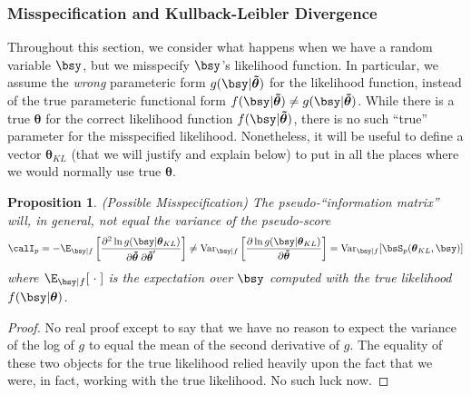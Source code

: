 \documentclass[12pt]{article}
\theoremstyle{plain}
\newtheorem{prop}[thm]{Proposition}
\theoremstyle{definition}
\theoremstyle{remark}
\newcommand{\bstheta}{\boldsymbol{\theta}}
\newcommand{\bstildetheta}{\boldsymbol{\tilde{\theta}}}
\newcommand{\Var}{\operatorname{Var}}
\begin{document}
\subsubsection{Misspecification and Kullback-Leibler Divergence}

Throughout this section, we consider what happens when we have a random
variable $\bsy$, but we misspecify $\bsy$'s likelihood function.
In particular, we assume the \emph{wrong} parameteric form
$g(\bsy|\bstildetheta)$ for the likelihood function, instead of the true
parameteric functional form $f(\bsy|\bstildetheta)\neq
g(\bsy|\bstildetheta)$. While there is a true $\bstheta$ for the correct
likelihood function $f(\bsy|\bstildetheta)$, there is no such ``true''
parameter for the misspecified likelihood. Nonetheless, it will be
useful to define a vector $\bstheta_{KL}$ (that we will justify and
explain below) to put in all the places where we would normally use true
$\bstheta$.

\begin{prop}\emph{(Possible Misspecification)}
The pseudo-``information matrix'' will, in general, not equal the
variance of the pseudo-score
\begin{align*}
  \calI_p
  =
  -\E_{\bsy|f}\left[
    \frac{\partial^2 \ln g(\bsy|\bstheta_{KL})}{%
      \partial\bstildetheta\;\partial\bstildetheta'}
  \right]
  \neq
  \Var_{\bsy|f}\left[
    \frac{\partial \ln g(\bsy|\bstheta_{KL})}{%
      \partial\bstildetheta}
  \right]
  =
  \Var_{\bsy|f}[\bsS_p(\bstheta_{KL},\bsy)]
\end{align*}
where $\E_{\bsy|f}[\;\cdot\;]$ is the expectation over $\bsy$ computed
with the true likelihood $f(\bsy|\bstheta)$.
\end{prop}
\begin{proof}
No real proof except to say that we have no reason to expect the
variance of the log of $g$ to equal the mean of the second derivative of
$g$. The equality of these two objects for the true likelihood relied
heavily upon the fact that we were, in fact, working with the true
likelihood. No such luck now.
\end{proof}
\end{document}
